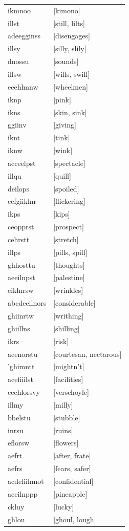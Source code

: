 \documentclass{article}
\begin{document}
\begin{tabular}{ll}
ikmnoo & [kimono] \\
illst & [still, lilts] \\
adeegginss & [disengages] \\
illsy & [silly, slily] \\
dnossu & [sounds] \\
illsw & [wills, swill] \\
eeehlmnw & [wheelmen] \\
iknp & [pink] \\
ikns & [skin, sink] \\
ggiinv & [giving] \\
iknt & [tink] \\
iknw & [wink] \\
acceelpst & [spectacle] \\
illqu & [quill] \\
deilops & [spoiled] \\
cefgiiklnr & [flickering] \\
ikps & [kips] \\
ceopprst & [prospect] \\
cehrstt & [stretch] \\
illps & [pills, spill] \\
ghhosttu & [thoughts] \\
aeeilnpst & [palestine] \\
eiklnrsw & [wrinkles] \\
abcdeeilnors & [considerable] \\
ghiinrtw & [writhing] \\
ghiillns & [shilling] \\
ikrs & [risk] \\
acenorstu & [courtesan, nectarous] \\
'ghimntt & [mightn't] \\
acefiiilst & [facilities] \\
ceehlorsvy & [verschoyle] \\
illmy & [milly] \\
bbelstu & [stubble] \\
inrsu & [ruins] \\
eflorsw & [flowers] \\
aefrt & [after, frate] \\
aefrs & [fears, safer] \\
acdefiilnnot & [confidential] \\
aeeilnppp & [pineapple] \\
ckluy & [lucky] \\
ghlou & [ghoul, lough] \\

\end{tabular}
\end{document}
